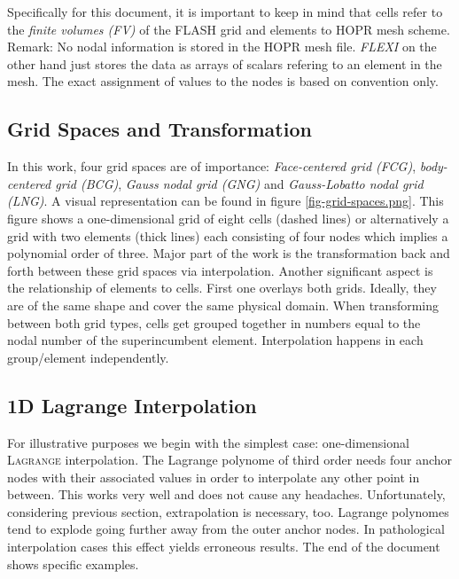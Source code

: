 Specifically for this document, it is important to keep in mind that cells
refer to the \emph{finite volumes (FV)} of the \textsc{FLASH} grid and elements
to \textsc{HOPR} mesh scheme. Remark: No nodal information is stored in the
\textsc{HOPR} mesh file. \emph{FLEXI} on the other hand just stores the data as
arrays of scalars refering to an element in the mesh. The exact assignment of
values to the nodes is based on convention only.

\subsection{Grid Spaces and Transformation}
In this work, four grid spaces are of importance: \emph{Face-centered grid
(FCG)}, \emph{body-centered grid (BCG)}, \emph{Gauss nodal grid (GNG)} and
\emph{Gauss-Lobatto nodal grid (LNG)}. A visual representation can be found in
figure \ref{fig-grid-spaces.png}. This figure shows a one-dimensional grid of
eight cells (dashed lines) or alternatively a grid with two elements (thick
lines) each consisting of four nodes which implies a polynomial order of three.
Major part of the work is the transformation back and forth between these
grid spaces via interpolation. Another significant aspect is the relationship
of elements to cells. First one overlays both grids. Ideally, they are of the
same shape and cover the same physical domain. When transforming between both
grid types, cells get grouped together in numbers equal to the nodal number of
the superincumbent element. Interpolation happens in each group/element
independently.


\subsection{1D Lagrange Interpolation}

For illustrative purposes we begin with the simplest case: one-dimensional
\textsc{Lagrange} interpolation.
The Lagrange polynome of third order needs four anchor nodes with their
associated values in order to interpolate any other point in between. This
works very well and does not cause any headaches. Unfortunately, considering
previous section, extrapolation is necessary, too. Lagrange polynomes tend to
explode going further away from the outer anchor nodes. In pathological
interpolation cases this effect yields erroneous results. The end of the
document shows specific examples.

